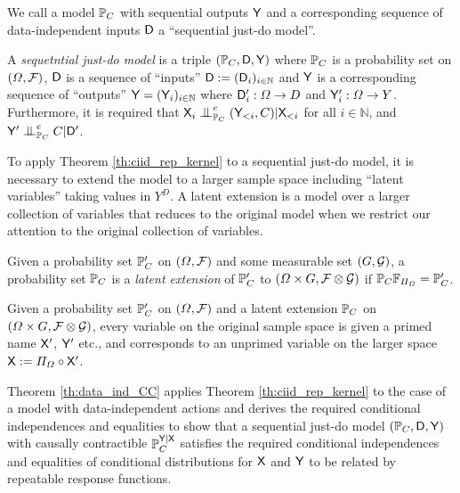 We call a model $\mathbb{P}_C$ with sequential outputs $\mathsf{Y}$ and a corresponding sequence of data-independent inputs $\mathsf{D}$ a ``sequential just-do model''.

\begin{definition}
A \emph{sequetntial just-do model} is a triple $(\mathbb{P}_C,\mathsf{D},\mathsf{Y})$ where $\mathbb{P}_C$ is a probability set on $(\Omega,\mathcal{F})$, $\mathsf{D}$ is a sequence of ``inputs'' $\mathsf{D}:=(\mathsf{D}_i)_{i\in\mathbb{N}}$ and $\mathsf{Y}$ is a corresponding sequence of ``outputs'' $\mathsf{Y}=(\mathsf{Y}_i)_{i\in\mathbb{N}}$ where $\mathsf{D}_i':\Omega\to D$ and $\mathsf{Y}_i':\Omega\to Y$. Furthermore, it is required that $\RV{X}_i\CI^e_{\prob{P}_C} (\RV{Y}_{<i},C)|\RV{X}_{<i}$ for all $i\in \mathbb{N}$, and $\RV{Y}'\CI^e_{\prob{P}_C} C|\RV{D}'$.
\end{definition}

To apply Theorem \ref{th:ciid_rep_kernel} to a sequential just-do model, it is necessary to extend the model to a larger sample space including ``latent variables'' taking values in $Y^D$. A latent extension is a model over a larger collection of variables that reduces to the original model when we restrict our attention to the original collection of variables.

\begin{definition}
Given a probability set $\mathbb{P}_C'$ on $(\Omega,\mathcal{F})$ and some measurable set $(G,\mathcal{G})$, a probability set $\mathbb{P}_C$ is a \emph{latent extension} of $\mathbb{P}_C'$ to $(\Omega\times G,\mathcal{F}\otimes \mathcal{G})$ if $\mathbb{P}_C \mathbb{F}_{\Pi_{\Omega}} = \mathbb{P}_C'$.
\end{definition}

\begin{convention}
Given a probability set $\mathbb{P}_C'$ on $(\Omega,\mathcal{F})$ and a latent extension $\mathbb{P}_C$ on $(\Omega\times G,\mathcal{F}\otimes \mathcal{G})$, every variable on the original sample space is given a primed name $\mathsf{X}'$, $\mathsf{Y}'$ etc., and corresponds to an unprimed variable on the larger space $\mathsf{X}:=\Pi_\Omega\circ \mathsf{X}'$.
\end{convention}

Theorem \ref{th:data_ind_CC} applies Theorem \ref{th:ciid_rep_kernel} to the case of a model with data-independent actions and derives the required conditional independences and equalities to show that a sequential just-do model $(\mathbb{P}_C,\mathsf{D},\mathsf{Y})$ with causally contractible $\mathbb{P}_C^{\mathsf{Y}|\mathsf{X}}$ satisfies the required conditional independences and equalities of conditional distributions for $\mathsf{X}$ and $\mathsf{Y}$ to be related by repeatable response functions.

